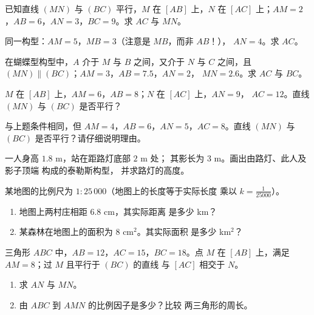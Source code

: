 \begin{exercise}[$\star$]\label{exo:g9:thales:1}
已知直线 $(MN)$ 与 $(BC)$ 平行，$M$ 在 $[AB]$ 上，$N$ 在
$[AC]$ 上；$AM = 2$，$AB = 6$，$AN = 3$，$BC = 9$。求 $AC$ 与 $MN$。
\end{exercise}

\begin{exercise}[$\star$]\label{exo:g9:thales:2}
同一构型：$AM = 5$，$MB = 3$（注意是 $MB$，而非 $AB$！），
$AN = 4$。求 $AC$。
\end{exercise}

\begin{exercise}[$\star$]\label{exo:g9:thales:3}
在蝴蝶型构型中，$A$ 介于 $M$ 与 $B$ 之间，又介于 $N$
与 $C$ 之间，且 $(MN) \parallel (BC)$；$AM = 3$，$AB = 7.5$，$AN = 2$，
$MN = 2.6$。求 $AC$ 与 $BC$。
\end{exercise}

\begin{exercise}[$\star$]\label{exo:g9:thales:4}
$M$ 在 $[AB]$ 上，$AM = 6$，$AB = 8$；$N$ 在 $[AC]$ 上，$AN = 9$，
$AC = 12$。直线 $(MN)$ 与 $(BC)$ 是否平行？
\end{exercise}

\begin{exercise}[$\star\star$]\label{exo:g9:thales:5}
与上题条件相同，但 $AM = 4$，$AB = 6$，$AN = 5$，$AC = 8$。直线 $(MN)$
与 $(BC)$ 是否平行？请仔细说明理由。
\end{exercise}

\begin{exercise}[$\star\star$]\label{exo:g9:thales:6}
一人身高 $1.8$ m，站在距路灯底部 $2$ m 处；
其影长为 $3$ m。画出由路灯、此人及影子顶端
构成的泰勒斯构型，
并求路灯的高度。
\end{exercise}

\begin{exercise}[$\star\star$]\label{exo:g9:thales:7}
某地图的比例尺为 $1 : 25\,000$（地图上的长度等于实际长度
乘以 $k = \frac{1}{25000}$）。
\begin{enumerate}
  \item 地图上两村庄相距 $6.8$ cm，其实际距离
        是多少 km？
  \item 某森林在地图上的面积为 $8$ cm$^2$。其实际面积
        是多少 km$^2$？
\end{enumerate}
\end{exercise}

\begin{exercise}[$\star\star$]\label{exo:g9:thales:8}
三角形 $ABC$ 中，$AB = 12$，$AC = 15$，$BC = 18$。点 $M$ 在
$[AB]$ 上，满足 $AM = 8$；过 $M$ 且平行于 $(BC)$ 的直线
与 $[AC]$ 相交于 $N$。
\begin{enumerate}
  \item 求 $AN$ 与 $MN$。
  \item 由 $ABC$ 到 $AMN$ 的比例因子是多少？比较
        两三角形的周长。
\end{enumerate}
\end{exercise}

